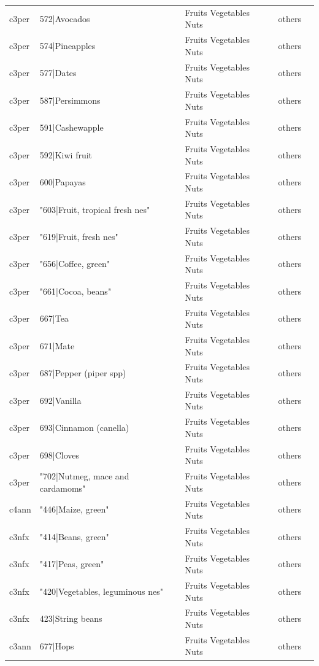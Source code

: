 \documentclass[gc, manuscript]{copernicus}
\begin{document}
\begin{table}[htbp]
\begin{tabular}{lllll}
      c3per & 572|Avocados & Fruits Vegetables Nuts & others \\ 
      c3per & 574|Pineapples & Fruits Vegetables Nuts & others \\ 
      c3per & 577|Dates & Fruits Vegetables Nuts & others \\ 
      c3per & 587|Persimmons & Fruits Vegetables Nuts & others \\ 
      c3per & 591|Cashewapple & Fruits Vegetables Nuts & others \\ 
      c3per & 592|Kiwi fruit & Fruits Vegetables Nuts & others \\ 
      c3per & 600|Papayas & Fruits Vegetables Nuts & others \\ 
      c3per & "603|Fruit, tropical fresh nes" & Fruits Vegetables Nuts & others \\ 
      c3per & "619|Fruit, fresh nes" & Fruits Vegetables Nuts & others \\ 
      c3per & "656|Coffee, green" & Fruits Vegetables Nuts & others \\ 
      c3per & "661|Cocoa, beans" & Fruits Vegetables Nuts & others \\ 
      c3per & 667|Tea & Fruits Vegetables Nuts & others \\ 
      c3per & 671|Mate & Fruits Vegetables Nuts & others \\ 
      c3per & 687|Pepper (piper spp) & Fruits Vegetables Nuts & others \\ 
      c3per & 692|Vanilla & Fruits Vegetables Nuts & others \\ 
      c3per & 693|Cinnamon (canella) & Fruits Vegetables Nuts & others \\ 
      c3per & 698|Cloves & Fruits Vegetables Nuts & others \\ 
      c3per & "702|Nutmeg, mace and cardamoms" & Fruits Vegetables Nuts & others \\ 
      c4ann & "446|Maize, green" & Fruits Vegetables Nuts & others \\ 
      c3nfx & "414|Beans, green" & Fruits Vegetables Nuts & others \\ 
      c3nfx & "417|Peas, green" & Fruits Vegetables Nuts & others \\ 
      c3nfx & "420|Vegetables, leguminous nes" & Fruits Vegetables Nuts & others \\ 
      c3nfx & 423|String beans & Fruits Vegetables Nuts & others \\ 
      c3ann & 677|Hops & Fruits Vegetables Nuts & others \\ 

\end{tabular}
\end{table}
\end{document}
